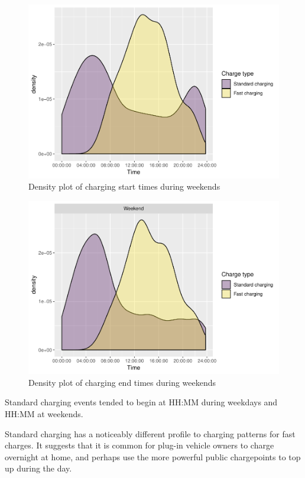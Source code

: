 \documentclass[]{article}
\begin{document}
\begin{figure}
\centering
\includegraphics{EVBB_SummaryReport_files/figure-latex/chargeBeginsWeekend-1.pdf}
\caption{\label{fig:chargeBeginsWeekend}Density plot of charging start times
during weekends}
\end{figure}

\begin{figure}
\centering
\includegraphics{EVBB_SummaryReport_files/figure-latex/chargeEndsWeekend-1.pdf}
\caption{\label{fig:chargeEndsWeekend}Density plot of charging end times
during weekends}
\end{figure}

Standard charging events tended to begin at HH:MM during weekdays and
HH:MM at weekends.

Standard charging has a noticeably different profile to charging
patterns for fast charges. It suggests that it is common for plug-in
vehicle owners to charge overnight at home, and perhaps use the more
powerful public chargepoints to top up during the day.
\end{document}
